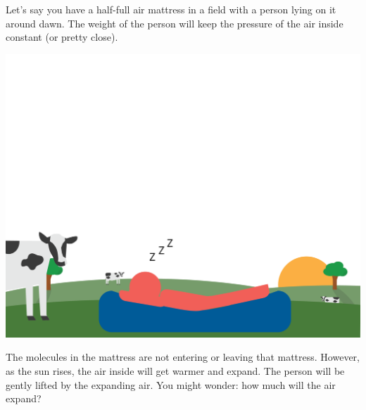 Let's say you have a half-full air mattress in a field with a person lying on it around dawn.   The weight of the person will keep the pressure of the air inside constant (or pretty close).  

\includegraphics[width=\textwidth]{airMattress1.png}


The molecules in the mattress are not entering or leaving that mattress.  However, as the sun rises,  the air inside will get warmer and expand.  The person will be gently lifted by the expanding air.  You might wonder: how much will the air expand?

